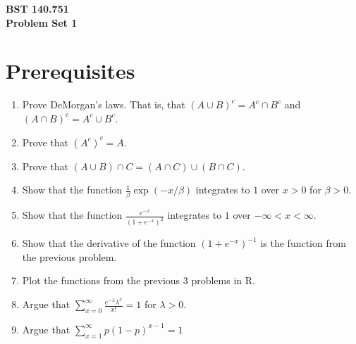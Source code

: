 \documentclass[12pt]{article}
\begin{document}
\noindent
{\bf BST 140.751 \\ Problem Set 1} \\
\section{Prerequisites}
\begin{enumerate}[1.]
\item Prove DeMorgan's laws. That is, that $(A \cup B ) ^c = A^c \cap B^c$ and $(A \cap B) ^ c = A^c \cup B^c$.
\item Prove that $(A^c)^c = A$.
\item Prove that $(A \cup B) \cap C = (A\cap C) \cup (B\cap C)$.
\item Show that the function $\frac{1}{\beta} \exp(-x / \beta)$ integrates to $1$ over $x > 0$ for $\beta > 0$.
\item Show that the function $\frac{e^{-x}}{\left(1+  e^{-x} \right)^2}$ integrates to $1$ over $-\infty < x < \infty$.
\item Show that the derivative of the function $(1 + e^{-x})^{-1}$ is the function from the previous problem.
\item Plot the functions from the previous 3 problems in R.
\item Argue that $\sum_{x=0}^\infty \frac{e^{-\lambda}\lambda^x}{x!} = 1$ for $\lambda > 0$.
\item Argue that $\sum_{x=1}^\infty p(1 - p)^{x-1} = 1$ 
\end{enumerate}
\end{document}
